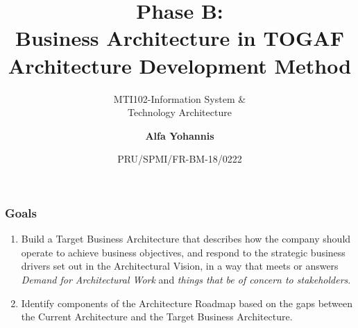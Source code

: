 \documentclass[aspectratio=169, table]{beamer}
\subtitle{MTI102-Information System \&\\Technology Architecture}
\title{Phase B:\\Business Architecture in TOGAF\\
     Architecture Development Method}
\date[Serial]{\scriptsize {PRU/SPMI/FR-BM-18/0222}}
\author[Pradita]{\small {\textbf{Alfa Yohannis}}}
\begin{document}
    \frame{\titlepage}

    \begin{frame}
        \frametitle{Goals}
        \begin{enumerate}
            \item Build a Target Business Architecture that describes how the company should operate to achieve business objectives, and respond to the strategic business drivers set out in the Architectural Vision, in a way that meets or answers \textit{Demand for Architectural Work} and \textit{things that be of concern to stakeholders}.

            \item Identify components of the Architecture Roadmap based on the gaps between the Current Architecture and the Target Business Architecture.
        \end{enumerate}
    \end{frame}
\end{document}

